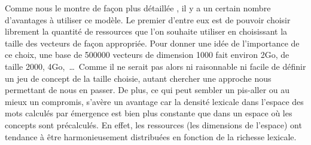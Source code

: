 




Comme nous le montre de façon plus détaillée \cite{Lafourcade-emergence2006}, il y a un certain nombre d'avantages à
utiliser ce modèle. Le premier d'entre eux est de pouvoir choisir
librement la quantité de ressources que l'on souhaite utiliser en
choisissant la taille des vecteurs de façon appropriée. Pour donner
une idée de l'importance de ce choix, une base de 500000 vecteurs de
dimension 1000 fait environ 2Go, de taille 2000, 4Go,~\ldots~Comme il
ne serait pas alors ni raisonnable ni facile de définir un jeu de
concept de la taille choisie, autant chercher une approche nous
permettant de nous en passer. De plus, ce qui peut sembler un
pis-aller ou au mieux un compromis, s'avère un avantage car la densité
lexicale dans l'espace des mots calculés par émergence est bien plus
constante que dans un espace où les concepts sont précalculés. En
effet, les ressources (les dimensions de l'espace) ont tendance à être
harmonieusement distribuées en fonction de la richesse lexicale.

